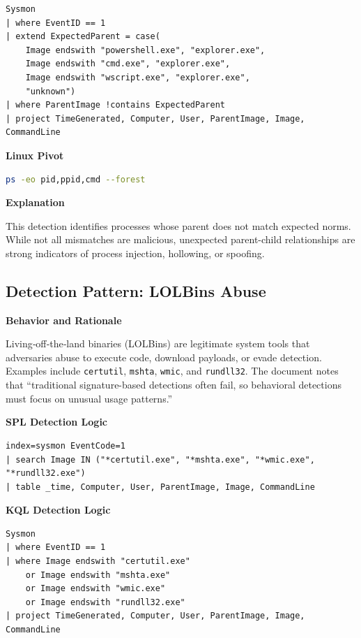 \begin{lstlisting}
Sysmon
| where EventID == 1
| extend ExpectedParent = case(
    Image endswith "powershell.exe", "explorer.exe",
    Image endswith "cmd.exe", "explorer.exe",
    Image endswith "wscript.exe", "explorer.exe",
    "unknown")
| where ParentImage !contains ExpectedParent
| project TimeGenerated, Computer, User, ParentImage, Image, CommandLine
\end{lstlisting}

\textbf{Linux Pivot}

\begin{lstlisting}[language=bash]
ps -eo pid,ppid,cmd --forest
\end{lstlisting}

\textbf{Explanation}

This detection identifies processes whose parent does not match expected norms. While not all mismatches are malicious, 
unexpected parent-child relationships are strong indicators of process injection, hollowing, or spoofing.


\subsection*{Detection Pattern: LOLBins Abuse}

\textbf{Behavior and Rationale}

Living‑off‑the‑land binaries (LOLBins) are legitimate system tools that adversaries abuse to execute code, download payloads, 
or evade detection. Examples include \texttt{certutil}, \texttt{mshta}, \texttt{wmic}, and \texttt{rundll32}. The document notes 
that “traditional signature-based detections often fail, so behavioral detections must focus on unusual usage patterns.”

\textbf{SPL Detection Logic}

\begin{lstlisting}
index=sysmon EventCode=1
| search Image IN ("*certutil.exe", "*mshta.exe", "*wmic.exe", "*rundll32.exe")
| table _time, Computer, User, ParentImage, Image, CommandLine
\end{lstlisting}

\textbf{KQL Detection Logic}

\begin{lstlisting}
Sysmon
| where EventID == 1
| where Image endswith "certutil.exe"
    or Image endswith "mshta.exe"
    or Image endswith "wmic.exe"
    or Image endswith "rundll32.exe"
| project TimeGenerated, Computer, User, ParentImage, Image, CommandLine
\end{lstlisting}


